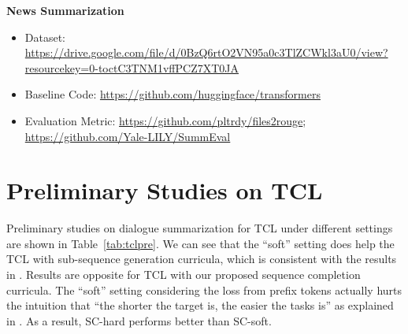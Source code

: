 \textbf{News Summarization}
\begin{itemize}
	\item Dataset: \url{https://drive.google.com/file/d/0BzQ6rtO2VN95a0c3TlZCWkl3aU0/view?resourcekey=0-toctC3TNM1vffPCZ7XT0JA}
	\item Baseline Code: \url{https://github.com/huggingface/transformers}
	\item Evaluation Metric: \url{https://github.com/pltrdy/files2rouge}; \url{https://github.com/Yale-LILY/SummEval}
\end{itemize}

\section{Preliminary Studies on TCL}
\label{sec:preliminary}

Preliminary studies on dialogue summarization for TCL under different settings are shown in Table~\ref{tab:tclpre}.
We can see that the ``soft'' setting does help the TCL with sub-sequence generation curricula, which is consistent with the results in \citet{liang-etal-2021-token-wise}.
Results are opposite for TCL with our proposed sequence completion curricula. The ``soft'' setting considering the loss from prefix tokens actually hurts the intuition that ``the shorter the target is, the easier the tasks is'' as explained in .  As a result, SC-hard performs better than SC-soft.


